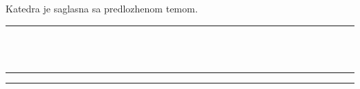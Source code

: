 \documentclass[a4paper]{article}
\begin{document}
\vspace{1cm}


\begin{flushleft}
Katedra \makebox[9.5cm][l]{\textbf{}} je saglasna sa predlozhenom temom.
\vspace{-3mm}
\hspace*{13mm} \rule[2.3cm]{9.5cm}{.05mm}\\
\vspace{-1cm}
\makebox[6.5cm][c]{} \hfill \makebox[6.5cm][c]{}\\
\rule[4mm]{6.5cm}{.05mm} \hfill \rule[4mm]{6.5cm}{.05mm}\\
\vspace{-5mm}
 \hfill {}
\end{flushleft}
\end{document}
